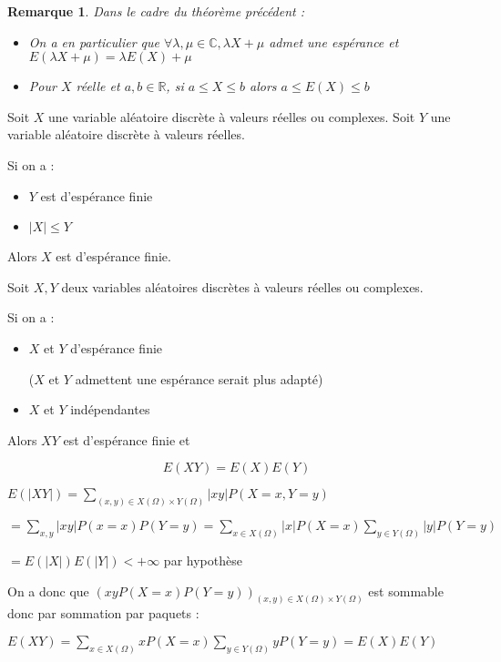 \documentclass[a4paper,12pt]{book}
\newcommand{\Thr}[2]{\begin{tcolorbox}[sharp corners, colback=white,colframe=red!90!black!75, title=Théorème : #1]#2\end{tcolorbox}}
\newcommand{\Pre}[1]{\begin{tcolorbox}[sharp corners, colback=white,colframe=green!60!green!30!black!75, title=Preuve]#1\end{tcolorbox}}
\newtheorem{Rem}{Remarque}[section]
\def\R{\mathbb{R}}
\def\C{\mathbb{C}}
\begin{document}
\begin{Rem}
Dans le cadre du théorème précédent : \begin{itemize}
\item On a en particulier que $\forall \lambda,\mu \in\C,\lambda X+\mu$ admet une espérance et $E(\lambda X + \mu)=\lambda E(X)+\mu$
\item Pour $X$ réelle et $a,b\in \R$, si $a\leq X\leq b$ alors $a\leq E(X)\leq b$
\end{itemize}
\end{Rem}
\Thr{Critère de majoration positif}{Soit $X$ une variable aléatoire discrète à valeurs réelles ou complexes. Soit $Y$ une variable aléatoire discrète à valeurs réelles.
\par Si on a :\begin{itemize}
\item $Y$ est d'espérance finie
\item $\vert X\vert\leq Y$
\end{itemize}
Alors $X$ est d'espérance finie.}
\Thr{Espérance d'un produit de variables indépendantes}{Soit $X,Y$ deux variables aléatoires discrètes à valeurs réelles ou complexes.
\par Si on a :\begin{itemize}
\item $X$ et $Y$ d'espérance finie
\par ($X$ et $Y$ admettent une espérance serait plus adapté)
\item $X$ et $Y$ indépendantes
\end{itemize}
Alors $XY$ est d'espérance finie et
\par $$E(XY)=E(X)E(Y)$$}
\Pre{$E(\vert XY\vert) = \sum\limits_{(x,y)\in X(\Omega)\times Y(\Omega)}\vert xy\vert P(X=x, Y=y)$
\par $ = \sum\limits_{x,y}\vert xy\vert P(x=x)P(Y=y) = \sum\limits_{x\in X(\Omega)}\vert x\vert P(X=x) \sum\limits_{y\in Y(\Omega)}\vert y\vert P(Y=y)$
\par $=E(\vert X\vert)E(\vert Y\vert)<+\infty$ par hypothèse
\par On a donc que $(xyP(X=x)P(Y=y))_{(x,y)\in X(\Omega)\times Y(\Omega)}$ est sommable donc par sommation par paquets :
\par $E(XY)=\sum\limits_{x\in X(\Omega)}xP(X=x)\sum\limits_{y\in Y(\Omega)}yP(Y=y) = E(X)E(Y)$}
\end{document}

